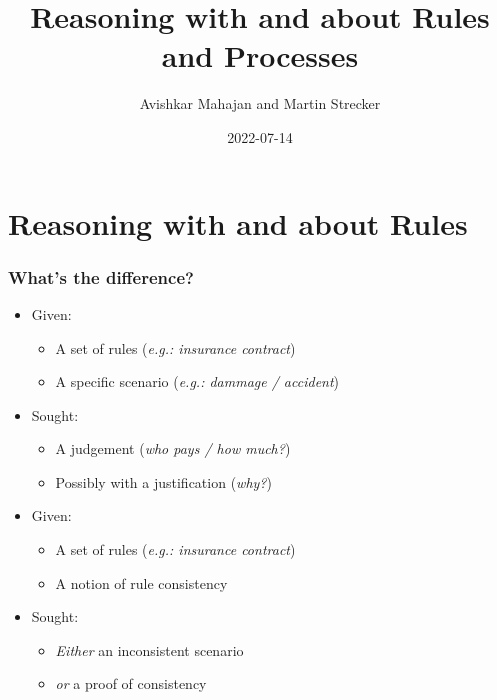 \documentclass{beamer}
\title{Reasoning with and about Rules and Processes}
\author{Avishkar Mahajan and Martin Strecker}
\date{2022-07-14}
\begin{document}

\begin{frame}
  \titlepage
\end{frame}



\section{Reasoning with and about Rules}


\begin{frame}[fragile]\frametitle{What's the difference?}

  \begin{itemize}
  \item Given:
    \begin{itemize}
    \item A set of rules  (\emph{e.g.: insurance contract})
    \item A specific scenario (\emph{e.g.: dammage / accident})
    \end{itemize}
  \item Sought:
    \begin{itemize}
    \item A judgement (\emph{who pays / how much?})
    \item Possibly with a justification (\emph{why?})
    \end{itemize}
  \end{itemize}

  \vspace{4mm}
  \begin{itemize}
  \item Given:
    \begin{itemize}
    \item A set of rules  (\emph{e.g.: insurance contract})
    \item A notion of rule consistency
    \end{itemize}
  \item Sought:
    \begin{itemize}
    \item \emph{Either} an inconsistent scenario 
    \item \emph{or} a proof of consistency
    \end{itemize}
  \end{itemize}


\end{frame}
\end{document}
